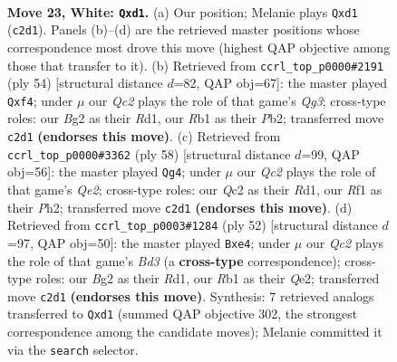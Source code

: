 \documentclass[11pt]{article}
\begin{document}
\clearpage

\begin{figure}[p]\centering
\begin{subfigure}{0.46\textwidth}\centering
\resizebox{\linewidth}{!}{%
\newchessgame
\chessboard[
  setfen={r3qrk1/6b1/1pn5/p1p1Ppnp/2P5/1P1N4/PBQP2B1/1R1b1RK1 w - - 0 23},
  showmover=false,
  pgfstyle=straightmove, color=movearrow, markmove={c2-d1}
]}
\caption{}
\end{subfigure}\hfill
\begin{subfigure}{0.46\textwidth}\centering
\resizebox{\linewidth}{!}{%
\newchessgame
\chessboard[
  setfen={3rr1k1/1p1bqp1n/p1p3p1/P5P1/B3Pb2/2N3QP/1PP2PK1/R2R4 w - - 0 28},
  showmover=false,
  pgfstyle=straightmove, color=movearrow, markmove={g3-f4}
]}
\caption{}
\end{subfigure}
\\[4pt]
\begin{subfigure}{0.46\textwidth}\centering
\resizebox{\linewidth}{!}{%
\newchessgame
\chessboard[
  setfen={4qrk1/1b2b1pp/1r2pp2/5N2/1pB5/1Pn1P3/4QPPP/2RRN1K1 w - - 10 30},
  showmover=false,
  pgfstyle=straightmove, color=movearrow, markmove={e2-g4}
]}
\caption{}
\end{subfigure}\hfill
\begin{subfigure}{0.46\textwidth}\centering
\resizebox{\linewidth}{!}{%
\newchessgame
\chessboard[
  setfen={2q2rk1/1p2b1p1/2r4n/p2p1p2/P2Bb3/1NPB3P/1P2Q1P1/3R1RK1 w - - 0 27},
  showmover=false,
  pgfstyle=straightmove, color=movearrow, markmove={d3-e4}
]}
\caption{}
\end{subfigure}
\caption{\textbf{Move 23, White: \texttt{Qxd1}.} (a) Our position; Melanie plays \texttt{Qxd1} (\texttt{c2d1}). Panels (b)--(d) are the retrieved master positions whose correspondence most drove this move (highest QAP objective among those that transfer to it). (b) Retrieved from \texttt{ccrl\_top\_p0000\#2191} (ply 54) [structural distance $d$=82, QAP obj=67]: the master played \texttt{Qxf4}; under $\mu$ our \emph{Qc2} plays the role of that game's \emph{Qg3}; cross-type roles: our \emph{B}g2 as their \emph{R}d1, our \emph{R}b1 as their \emph{P}b2; transferred move \texttt{c2d1} \textbf{(endorses this move)}. (c) Retrieved from \texttt{ccrl\_top\_p0000\#3362} (ply 58) [structural distance $d$=99, QAP obj=56]: the master played \texttt{Qg4}; under $\mu$ our \emph{Qc2} plays the role of that game's \emph{Qe2}; cross-type roles: our \emph{Q}c2 as their \emph{R}d1, our \emph{R}f1 as their \emph{P}h2; transferred move \texttt{c2d1} \textbf{(endorses this move)}. (d) Retrieved from \texttt{ccrl\_top\_p0003\#1284} (ply 52) [structural distance $d$=97, QAP obj=50]: the master played \texttt{Bxe4}; under $\mu$ our \emph{Qc2} plays the role of that game's \emph{Bd3} (a \textbf{cross-type} correspondence); cross-type roles: our \emph{B}g2 as their \emph{R}d1, our \emph{R}b1 as their \emph{Q}e2; transferred move \texttt{c2d1} \textbf{(endorses this move)}. Synthesis: 7 retrieved analogs transferred to \texttt{Qxd1} (summed QAP objective 302, the strongest correspondence among the candidate moves); Melanie committed it via the \texttt{search} selector.}
\label{fig:thought-m44}
\end{figure}
\end{document}
